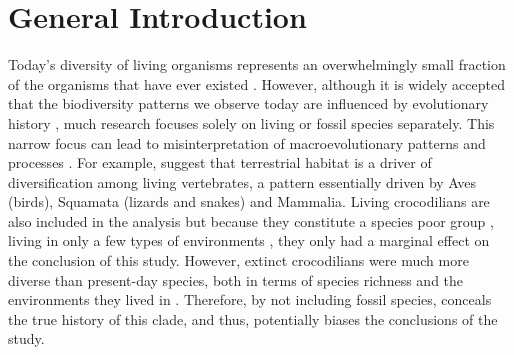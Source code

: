 \chapter{General Introduction}
\label{chap:introduction}




%
% 

Today's diversity of living organisms represents an overwhelmingly small fraction of the organisms that have ever existed \citep{novacek1992ext,raup1993extinction}.
However, although it is widely accepted that the biodiversity patterns %
we observe today are influenced by evolutionary history \citep{simpson1945,Gingerich1987,archibald2011extinction}, much research focuses solely on living or fossil species separately.
This narrow focus can lead to misinterpretation of macroevolutionary patterns and processes \citep{fritzdiversity2013,benton2015}.
For example, \cite{Wiens2015} suggest that terrestrial habitat is a driver of diversification among living vertebrates, a pattern essentially driven by Aves (birds), Squamata (lizards and snakes) and Mammalia. 
Living crocodilians are also included in the analysis but because they constitute a species poor group \citep[25 species;][]{uetz2010original}, living in only a few types of environments \citep[marine or freshwater;][]{Martin2008}, they only had a marginal effect on the conclusion of this study.
However, extinct crocodilians were much more diverse than present-day species, both in terms of species richness \citep[at least 244 species are reported in][]{Bronzati2015} and the environments they lived in \citep[extinct crocodilians species ranged from fully marine ones to fully terrestrial ones -- including even few tree-dwelling! --][]{stubbs2013}.
Therefore, by not including fossil species, \cite{Wiens2015} conceals the true history of this clade, and thus, potentially biases the conclusions of the study.


